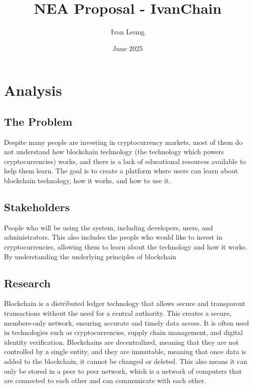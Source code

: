 \documentclass[12pt, a4paper]{article}
\title{NEA Proposal - IvanChain}
\author{Ivan Leung}
\date{June 2025}
\begin{document}
\maketitle
\newpage
\tableofcontents
\newpage

\section{Analysis}
\label{sec:introduction}

\subsection{The Problem}
Despite many people are investing in cryptocurrency markets, most of them do not understand how blockchain technology (the technology which powers cryptocurrencies) works, 
and there is a lack of educational resources available to help them learn.
The goal is to create a platform where users can learn about blockchain technology, how it works, and how to use it.
\newpage
\subsection{Stakeholders}
People who will be using the system, including developers, users, and administrators.
This also includes the people who would like to invest in cryptocurrencies, allowing them to learn about the technology and how it works.
By understanding the underlying principles of blockchain
\newpage
\subsection{Research}

Blockchain is a distributed ledger technology that allows secure and transparent transactions without the need for a central authority.
This creates a secure, members-only network, ensuring accurate and timely data access. It is often used in technologies such as cryptocurrencies, supply chain management, and digital identity verification.
Blockchains are decentralized, meaning that they are not controlled by a single entity, and they are immutable, meaning that once data is added to the blockchain, it cannot be changed or deleted.
This also means it can only be stored in a peer to peer network, which is a network of computers that are connected to each other and can communicate with each other.
\end{document}
